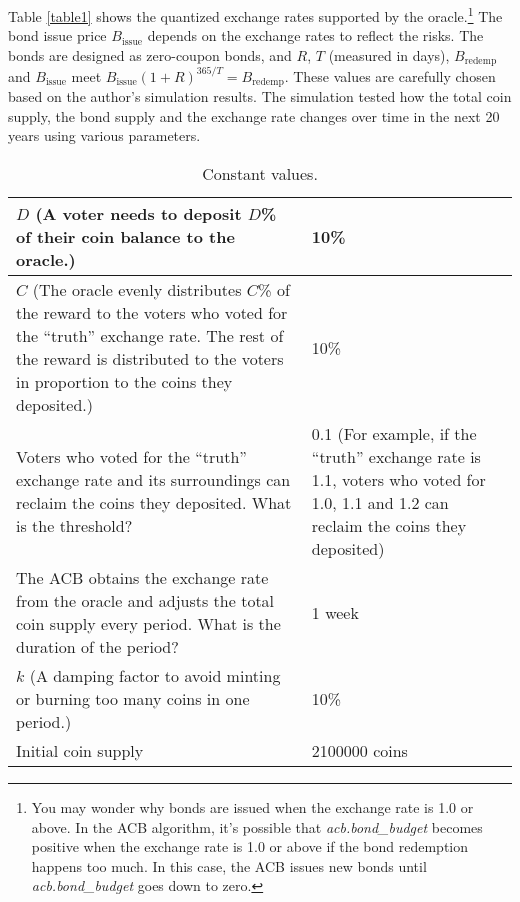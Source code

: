 \documentclass[dvipdfmx,a4paper]{article}
\begin{document}
Table \ref{table1} shows the quantized exchange rates supported by the oracle.\footnote{You may wonder why bonds are issued when the exchange rate is 1.0 or above. In the ACB algorithm, it's possible that \textit{acb.bond\_budget} becomes positive when the exchange rate is 1.0 or above if the bond redemption happens too much. In this case, the ACB issues new bonds until \textit{acb.bond\_budget} goes down to zero.} The bond issue price $B_{\mathrm{issue}}$ depends on the exchange rates to reflect the risks. The bonds are designed as zero-coupon bonds, and $R$, $T$ (measured in days), $B_{\mathrm{redemp}}$ and $B_{\mathrm{issue}}$ meet $B_{\mathrm{issue}}(1+R)^{365/T}=B_{\mathrm{redemp}}$. These values are carefully chosen based on the author's simulation results. The simulation tested how the total coin supply, the bond supply and the exchange rate changes over time in the next 20 years using various parameters.

\begin{table}[htb]
\begin{center}
\caption{Constant values.}\vspace{2ex}
\begin{tabular}{p{26em}|p{10em}}\hline
$D$ (A voter needs to deposit $D$\% of their coin balance to the oracle.) & 10\%\\\hline
$C$ (The oracle evenly distributes $C$\% of the reward to the voters who voted for the ``truth'' exchange rate. The rest of the reward is distributed to the voters in proportion to the coins they deposited.) & 10\%\\\hline
Voters who voted for the ``truth'' exchange rate and its surroundings can reclaim the coins they deposited. What is the threshold? & 0.1 (For example, if the ``truth'' exchange rate is 1.1, voters who voted for 1.0, 1.1 and 1.2 can reclaim the coins they deposited)\\\hline
The ACB obtains the exchange rate from the oracle and adjusts the total coin supply every period. What is the duration of the period? & 1 week\\\hline
$k$ (A damping factor to avoid minting or burning too many coins in one period.) & 10\%\\\hline
Initial coin supply & 2100000 coins\\\hline
\end{tabular}
\label{table2}
\end{center}
\end{table}
\end{document}
